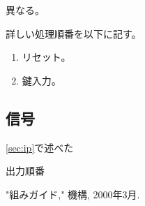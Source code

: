 \documentclass[11pt]{article}
\begin{document}
異なる。

詳しい処理順番を以下に記す。
\vspace{-1ex} \begin{enumerate}
\setlength{\itemsep}{-1ex}
\item リセット。
\item 鍵入力。
\end{enumerate}

\subsection{信号}
\ref{sec:ip}で述べた

出力順番




\begin{thebibliography}{9}

 "組みガイド," 機構, 2000年3月.

\end{thebibliography}

\begin{appendix}
\end{appendix}
\end{document}
